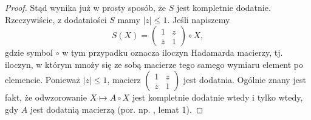 \begin{proof}
Stąd wynika już w prosty sposób, że $S$ jest kompletnie dodatnie.
Rzeczywiście,
z dodatniości $S$ mamy $|z| \leq 1$.
Jeśli napiszemy
\begin{equation}
S(X) =
\begin{pmatrix}
1 & z \\ \overline{z} & 1
\end{pmatrix} \circ X,
\end{equation}
gdzie symbol $\circ$ w tym przypadku oznacza iloczyn Hadamarda macierzy,
tj. iloczyn, w którym mnoży się ze sobą macierze tego samego wymiaru
element po elemencie.
Ponieważ $|z| \leq 1$, macierz
$
\left(
\begin{smallmatrix} 1 & z \\ \overline{z} & 1 \end{smallmatrix}
\right)$
jest dodatnia.
Ogólnie znany jest fakt, że odwzorowanie $X \mapsto A \circ X$
jest kompletnie dodatnie wtedy i tylko wtedy, gdy $A$
jest dodatnią macierzą
(por. np. \cite{besenyei2011completely}, lemat 1).
\end{proof}

